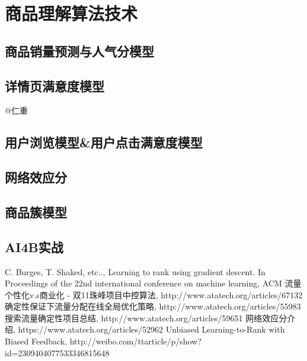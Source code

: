 
\chapter{ 商品理解算法技术 }
\thispagestyle{empty}

\setlength{\fboxrule}{0pt}\setlength{\fboxsep}{0cm}
\noindent\shadowbox{
\begin{tcolorbox}[arc=0mm,colback=lightblue,colframe=darkblue,title=学习目标与要求]

\end{tcolorbox}}
\setlength{\fboxrule}{1pt}\setlength{\fboxsep}{4pt} 

\section{商品销量预测与人气分模型 }

\section{详情页满意度模型} 
@仁重

\section{用户浏览模型\&用户点击满意度模型}  

\section{网络效应分}

\section{商品簇模型} 

\section{AI4B实战} 


\begin{thebibliography}{99}
 C. Burges, T. Shaked, etc.., Learning to rank 
using gradient descent. In Proceedings of the 22nd international 
conference on machine learning, ACM
 流量个性化v.s商业化 - 双11珠峰项目中控算法, http://www.atatech.org/articles/67132
 确定性保证下流量分配在线全局优化策略, http://www.atatech.org/articles/55983
 搜索流量确定性项目总结, http://www.atatech.org/articles/59651
 网络效应分介绍, https://www.atatech.org/articles/52962
 Unbiased Learning-to-Rank with Biased Feedback, http://weibo.com/ttarticle/p/show?id=2309404077533346815648
\end{thebibliography}

 
